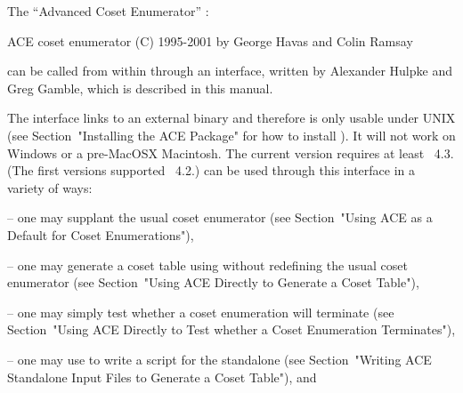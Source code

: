 

The ``Advanced Coset Enumerator'' {\ACE}:

\begintt
ACE coset enumerator (C) 1995-2001 by George Havas and Colin Ramsay
\endtt
{}

can  be called  from within  {\GAP} through  an interface,  written by
Alexander Hulpke and Greg Gamble, which is described in this manual.

The interface links to an external binary and therefore is only usable
under UNIX (see  Section~"Installing  the  ACE  Package"  for  how  to
install  {\ACE}).  It  will  not  work  on  Windows  or  a  pre-MacOSX
Macintosh. The current version  requires  at  least  {\GAP}~4.3.  (The
first versions supported {\GAP}~4.2.) {\ACE} can be used through  this
interface in a variety of ways:

\beginlist%

\item{--} one may supplant the  usual  {\GAP}  coset  enumerator  (see
Section~"Using ACE as a Default for Coset Enumerations"),

\item{--}  one  may  generate  a  coset  table  using  {\ACE}  without
redefining the usual {\GAP} coset enumerator (see  Section~"Using  ACE
Directly to Generate a Coset Table"),

\item{--} one  may  simply  test  whether  a  coset  enumeration  will
terminate (see Section~"Using ACE Directly to  Test  whether  a  Coset
Enumeration Terminates"),

\item{--} one may  use  {\GAP}  to  write  a  script  for  the  {\ACE}
standalone  (see  Section~"Writing  ACE  Standalone  Input  Files   to
Generate a Coset Table"), and

